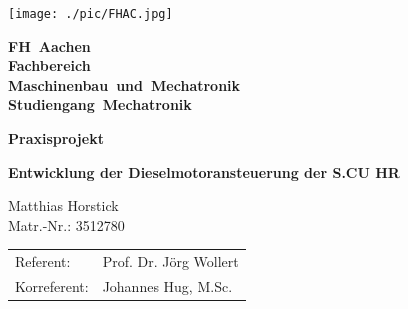 \begin{titlepage}

	\thispagestyle{empty}

	\begin{flushright}
		\texttt{[image: ./pic/FHAC.jpg]}
	\end{flushright}

	\vspace{-2.5cm}

	\centering \bfseries \Large FH~Aachen \\
	\vspace{0.5cm}
	\normalsize Fachbereich\\
	Maschinenbau~und~Mechatronik \\
	Studiengang~Mechatronik

	\vspace{1cm}

	\centering \bfseries Praxisprojekt

	\vspace{0.8cm}

	\centering \begin{minipage}[t]{17cm}
		\centering \bfseries \large Entwicklung der Dieselmotoransteuerung der S.CU HR
		\medskip
	\end{minipage}

	\vspace{1.5cm}

	\begin{minipage}[t]{9cm}
		\centering Matthias Horstick \\ Matr.-Nr.: 3512780    %
	\end{minipage}

	\vspace{2.1cm}

	\centering \begin{minipage}[t]{9cm}
		\centering \begin{tabular}{ll}
			Referent: & Prof. Dr. Jörg Wollert\\ 				%
			Korreferent: & Johannes Hug,  M.Sc. \\				%
			

\end{tabular}
\end{minipage}
\end{titlepage}
